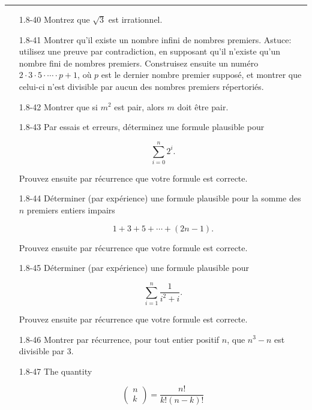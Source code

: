 \documentclass[10pt,twoside,a4paper]{book}
\begin{document}
\par\noindent\rule{\textwidth}{0.6pt}

\begin{enumerate}
  \item[1.8-40] Montrez que $\sqrt{3}$ est irrationnel.
  \item[1.8-41] Montrer qu'il existe un nombre infini de nombres premiers. Astuce: utilisez une preuve par contradiction, en supposant qu'il n'existe qu'un nombre fini de nombres premiers. 
  Construisez ensuite un numéro $2 \cdot 3 \cdot 5 \cdot \cdots \cdot p + 1$, où $p$ est le dernier nombre premier supposé, et montrer que celui-ci n'est divisible par aucun des nombres premiers répertoriés.
  \item[1.8-42] Montrer que si $m^2$ est pair, alors $m$ doit être pair.
  \item[1.8-43] Par essais et erreurs, déterminez une formule plausible pour
  
  \begin{equation*}
    \sum_{i=0}^{n}2^i.  
  \end{equation*}

  \noindent
  Prouvez ensuite par récurrence que votre formule est correcte.
  \item[1.8-44] Déterminer (par expérience) une formule plausible pour la somme des $n$ premiers entiers impairs
  
  \begin{equation*}
    1+3+5+ \cdots + (2n-1).
  \end{equation*}

  \noindent
  Prouvez ensuite par récurrence que votre formule est correcte.
  \item[1.8-45] Déterminer (par expérience) une formule plausible pour
  
  \begin{equation*}
    \sum_{i=1}^{n} \frac{1}{i^2+i}.
  \end{equation*}

  \noindent
  Prouvez ensuite par récurrence que votre formule est correcte.
  \item[1.8-46] Montrer par récurrence, pour tout entier positif $n$, que $n^3-n$ est divisible par 3.
  \item[1.8-47] The quantity

  \begin{equation*}
    \boxed{\begin{pmatrix}
      n \\
      k 
    \end{pmatrix} = \frac{n!}{k!(n-k)!}}
  \end{equation*}


\end{enumerate}
\end{document}

